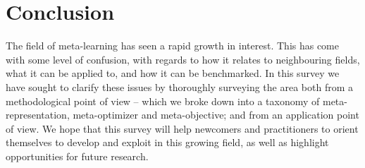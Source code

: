 \documentclass[10pt,journal,compsoc]{IEEEtran}
\begin{document}
 




\section{Conclusion}

The field of meta-learning has seen a rapid growth in interest. This has come with some level of confusion, with regards to how it relates to neighbouring fields, what it can be applied to, and how it can be benchmarked. In this survey we have sought to clarify these issues by thoroughly surveying the area both from a methodological point of view -- which we broke down into a taxonomy of meta-representation, meta-optimizer and meta-objective; and from an application point of view. We hope that this survey will help newcomers and practitioners to orient themselves to develop and exploit in this growing field, as well as highlight opportunities for future research.




%


\end{document}
